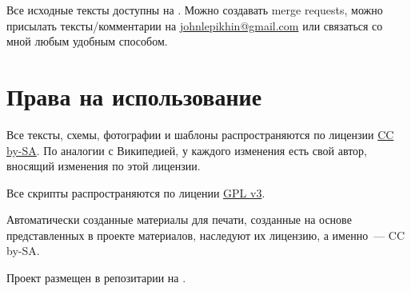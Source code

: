 \documentclass[11pt,fleqn]{report} %
\begin{document}
Все исходные тексты доступны на \gitRepo. Можно создавать merge
requests, можно присылать тексты/комментарии на
\href{mailto:johnlepikhin@gmail.com}{johnlepikhin@gmail.com} или
связаться со мной любым удобным способом.

\section{Права на использование}

Все тексты, схемы, фотографии и шаблоны распространяются по лицензии
\href{https://creativecommons.org/licenses/by-sa/4.0/legalcode.ru}{CC
  by-SA}. По аналогии с Википедией, у каждого изменения есть свой
автор, вносящий изменения по этой лицензии.

Все скрипты распространяются по лицении
\href{https://www.gnu.org/licenses/quick-guide-gplv3.ru.html}{GPL v3}.

Автоматически созданные материалы для печати, созданные на основе
представленных в проекте материалов, наследуют их лицензию, а
именно~--- CC by-SA.

Проект размещен в репозитарии на \gitRepo.

\clearpage
 
\printglossary[title={Термины}]
\end{document}

